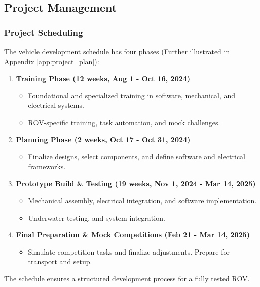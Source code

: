 \subsection{Project Management}

\subsubsection{Project Scheduling}

The vehicle development schedule has four phases (Further illustrated in Appendix \ref{app:project_plan}):

\vspace{-0.5\baselineskip}
\begin{enumerate}[leftmargin=0pt, itemindent=20pt]
    \setlength{\itemsep}{0pt} 
    \item \textbf{Training Phase (12 weeks, Aug 1 - Oct 16, 2024)}
    
    \vspace{-0.5\baselineskip}
    \begin{itemize}[leftmargin=0pt, itemindent=20pt]
        \setlength{\itemsep}{0pt} 
        \item Foundational and specialized training in software, mechanical, and electrical systems.
        \item ROV-specific training, task automation, and mock challenges.
    \end{itemize}
    \item \textbf{Planning Phase (2 weeks, Oct 17 - Oct 31, 2024)}
    \vspace{-0.8cm}
    \begin{itemize}[leftmargin=0pt, itemindent=20pt]
        \setlength{\itemsep}{0pt}
        \item Finalize designs, select components, and define software and electrical frameworks.
    \end{itemize}
    \item \textbf{Prototype Build \& Testing (19 weeks, Nov 1, 2024 - Mar 14, 2025)}
    \vspace{-0.5\baselineskip}
    \begin{itemize}[leftmargin=0pt, itemindent=20pt]
        \setlength{\itemsep}{0pt} 
        \item Mechanical assembly, electrical integration, and software implementation.
        \item Underwater testing, and system integration.
    \end{itemize}
    \item \textbf{Final Preparation \& Mock Competitions (Feb 21 - Mar 14, 2025)}
    
    \vspace{-0.5\baselineskip}
    \begin{itemize}[leftmargin=0pt, itemindent=20pt]
        \setlength{\itemsep}{0pt} 
        \item Simulate competition tasks and finalize adjustments. Prepare for transport and setup.
    \end{itemize}
\end{enumerate}
The schedule ensures a structured development process for a fully tested ROV.


